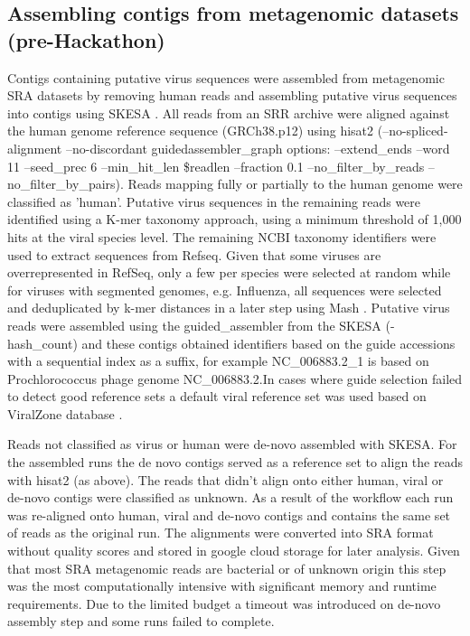   \subsection{Assembling contigs from metagenomic datasets (pre-Hackathon)}
  Contigs containing putative virus sequences were assembled from metagenomic
  SRA datasets by removing human reads and assembling putative virus sequences
  into contigs using SKESA \cite{Souvorov2018}. All reads from an SRR archive were aligned
  against the human genome reference sequence (GRCh38.p12) using hisat2
  \cite{Kim2015} (--no-spliced-alignment --no-discordant guidedassembler\_graph
  options: --extend\_ends  --word 11 --seed\_prec 6 --min\_hit\_len \$readlen
  --fraction 0.1 --no\_filter\_by\_reads --no\_filter\_by\_pairs). Reads mapping
  fully or partially  to the human genome were  classified as 'human'. Putative
  virus sequences in the remaining reads were identified using a K-mer taxonomy
  approach, using a minimum threshold of 1,000 hits at the viral species level.
  The remaining NCBI taxonomy identifiers were used to extract sequences from
  Refseq. Given that some viruses are overrepresented in RefSeq,  only a few
  per species were selected at random while for viruses with segmented genomes,
  e.g. Influenza, all sequences were selected and deduplicated by k-mer
  distances in a later step using Mash \cite{Ondov2019}. Putative virus reads were
  assembled using the guided\_assembler from the SKESA (-hash\_count) and these
  contigs obtained identifiers based on the guide accessions with a sequential
  index as a suffix, for example NC\_006883.2\_1 is based on Prochlorococcus
  phage genome NC\_006883.2.In cases where guide selection failed to detect good
  reference sets a default viral reference set was used based on ViralZone
  database \cite{Hulo2011}.

  Reads not classified as virus or human were de-novo assembled with SKESA. For
  the assembled runs the de novo contigs served as a reference set to align the
  reads with hisat2 (as above). The reads that didn't align onto either human,
  viral or de-novo contigs were classified as unknown. As a result of the
  workflow each run was re-aligned onto human, viral and de-novo contigs and
  contains the same set of reads as the original run. The alignments were
  converted into SRA format without quality scores and stored in google cloud
  storage for later analysis. Given that most SRA metagenomic reads are
  bacterial or of unknown origin this step was the most computationally
  intensive with significant memory and runtime requirements. Due to the
  limited budget a timeout was introduced on de-novo assembly step and some
  runs failed to complete.

